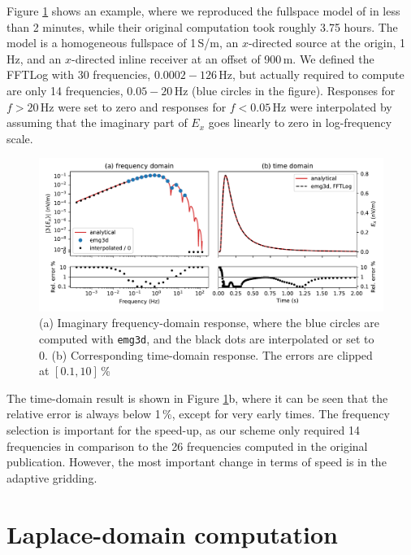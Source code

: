 \documentclass{eage2020}
\newcommand{\emg}[2]{\texttt{emg#1#2}\xspace}
\begin{document}
Figure \ref{fig:fullspace} shows an example, where we reproduced the fullspace
model of \cite{GEO.08.Mulder} in less than 2 minutes, while their original
computation took roughly 3.75 hours. The model is a homogeneous fullspace of
1\,S/m, an $x$-directed source at the origin, 1\,Hz, and an $x$-directed inline
receiver at an offset of 900\,m. We defined the FFTLog with 30 frequencies,
$0.0002-126\,$Hz, but actually required to compute are only 14 frequencies,
$0.05-20\,$Hz (blue circles in the figure). Responses for $f>20\,$Hz were set
to zero and responses for $f<0.05\,$Hz were interpolated by assuming that the
imaginary part of $E_x$ goes linearly to zero in log-frequency scale.
%
\begin{figure}[tb]
  \centering
  \includegraphics[width=\textwidth]{fullspace}
  \caption{(a) Imaginary frequency-domain response, where the blue circles are
    computed with \emg3d, and the black dots are interpolated or set to 0. (b)
    Corresponding time-domain response. The errors are clipped at $[0.1,
    10]$\,\%}
  \label{fig:fullspace}
\end{figure}
%

The time-domain result is shown in Figure \ref{fig:fullspace}b, where it can be
seen that the relative error is always below 1\,\%, except for very early
times. The frequency selection is important for the speed-up, as our scheme
only required 14 frequencies in comparison to the 26 frequencies computed in
the original publication. However, the most important change in terms of speed
is in the adaptive gridding.


\section{Laplace-domain computation}
\end{document}

